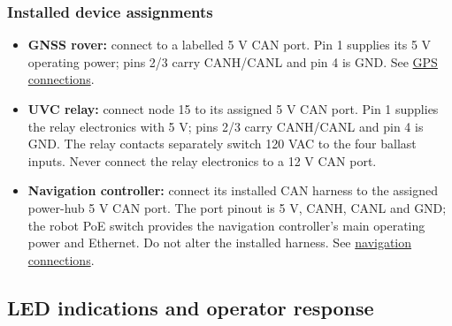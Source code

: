 \documentclass[
  10pt,
  letterpaper,
  openany]{report}
\providecommand{\tightlist}{%
  \setlength{\itemsep}{0pt}\setlength{\parskip}{0pt}}
\begin{document}
\subsubsection{Installed device
assignments}\label{installed-device-assignments}

\begin{itemize}
\tightlist
\item
  \textbf{GNSS rover:} connect to a labelled 5 V CAN port. Pin 1
  supplies its 5 V operating power; pins 2/3 carry CANH/CANL and pin 4
  is GND. See \hyperref[gps-connections]{GPS connections}.
\item
  \textbf{UVC relay:} connect node 15 to its assigned 5 V CAN port. Pin
  1 supplies the relay electronics with 5 V; pins 2/3 carry CANH/CANL
  and pin 4 is GND. The relay contacts separately switch 120 VAC to the
  four ballast inputs. Never connect the relay electronics to a 12 V CAN
  port.
\item
  \textbf{Navigation controller:} connect its installed CAN harness to
  the assigned power-hub 5 V CAN port. The port pinout is 5 V, CANH,
  CANL and GND; the robot PoE switch provides the navigation
  controller's main operating power and Ethernet. Do not alter the
  installed harness. See \hyperref[nav-connections]{navigation
  connections}.
\end{itemize}

\subsection{LED indications and operator response}\label{power-hub-led}
\end{document}
